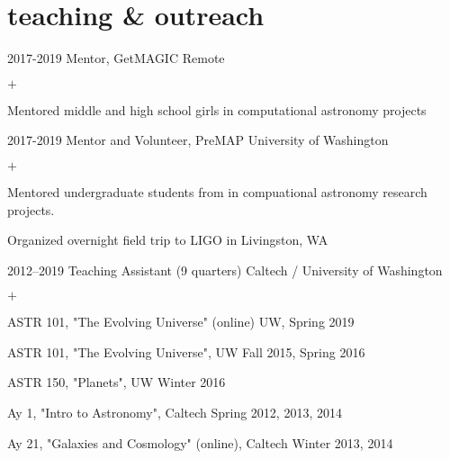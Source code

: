\documentclass[]{luger-cv} %
\begin{document}

\section{teaching \& outreach}

\begin{entrylist}


\entry
{2017-2019}
{Mentor, GetMAGIC}
{Remote}
{%
\vspace{-1em}
\begin{list}{$+$}{\cvlist}
\item Mentored middle and high school girls in computational astronomy projects
\end{list}
}


\entry
{2017-2019}
{Mentor and Volunteer, PreMAP}
{University of Washington}
{%
\vspace{-1em}
\begin{list}{$+$}{\cvlist}
\item Mentored undergraduate students from in compuational astronomy research projects.
\item Organized overnight field trip to LIGO in Livingston, WA
\end{list}
}


\entry
{2012--2019}
{Teaching Assistant (9 quarters)}
{Caltech / University of Washington}
{%
\vspace{-1em}
\begin{list}{$+$}{\cvlist}
\item ASTR 101, "The Evolving Universe" (online) UW, Spring 2019
\item ASTR 101, "The Evolving Universe", UW Fall 2015, Spring 2016
\item ASTR 150, "Planets", UW Winter 2016
\item Ay 1, "Intro to Astronomy", Caltech Spring 2012, 2013, 2014
\item Ay 21, "Galaxies and Cosmology" (online), Caltech Winter 2013, 2014
\end{list}
}



\end{entrylist}
\end{document}
